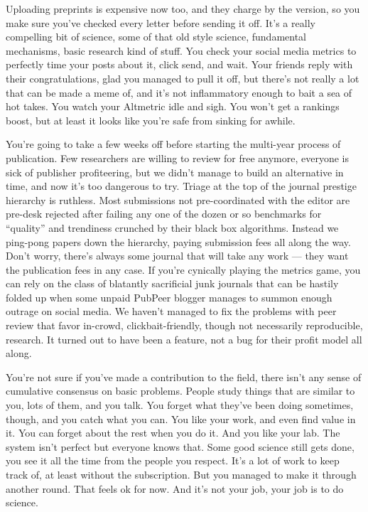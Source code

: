 Uploading preprints is expensive now too, and they charge by the
version, so you make sure you've checked every letter before sending it
off. It's a really compelling bit of science, some of that old style
science, fundamental mechanisms, basic research kind of stuff. You check
your social media metrics to perfectly time your posts about it, click
send, and wait. Your friends reply with their congratulations, glad you
managed to pull it off, but there's not really a lot that can be made a
meme of, and it's not inflammatory enough to bait a sea of hot takes.
You watch your Altmetric idle and sigh. You won't get a rankings boost,
but at least it looks like you're safe from sinking for awhile.

You're going to take a few weeks off before starting the multi-year
process of publication. Few researchers are willing to review for free
anymore, everyone is sick of publisher profiteering, but we didn't
manage to build an alternative in time, and now it's too dangerous to
try. Triage at the top of the journal prestige hierarchy is ruthless.
Most submissions not pre-coordinated with the editor are pre-desk
rejected after failing any one of the dozen or so benchmarks for
``quality'' and trendiness crunched by their black box algorithms.
Instead we ping-pong papers down the hierarchy, paying submission fees
all along the way. Don't worry, there's always some journal that will
take any work --- they want the publication fees in any case. If you're
cynically playing the metrics game, you can rely on the class of
blatantly sacrificial junk journals that can be hastily folded up when
some unpaid PubPeer blogger manages to summon enough outrage on social
media. We haven't managed to fix the problems with peer review that
favor in-crowd, clickbait-friendly, though not necessarily reproducible,
research. It turned out to have been a feature, not a bug for their
profit model all along.

You're not sure if you've made a contribution to the field, there isn't
any sense of cumulative consensus on basic problems. People study things
that are similar to you, lots of them, and you talk. You forget what
they've been doing sometimes, though, and you catch what you can. You
like your work, and even find value in it. You can forget about the rest
when you do it. And you like your lab. The system isn't perfect but
everyone knows that. Some good science still gets done, you see it all
the time from the people you respect. It's a lot of work to keep track
of, at least without the subscription. But you managed to make it
through another round. That feels ok for now. And it's not your job,
your job is to do science.

